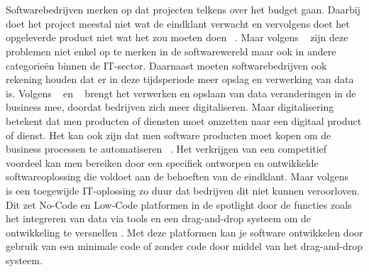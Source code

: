 
\chapter{}%
\label{ch:inleiding}



Softwarebedrijven merken op dat projecten telkens over het budget gaan. Daarbij doet het project meestal niet wat de eindklant verwacht en vervolgens doet het opgeleverde product niet wat het zou moeten doen ~\autocite{Moskal_2021}.
Maar volgens ~\textcite{Moskal_2021} zijn deze problemen niet enkel op te merken in de softwarewereld maar ook in andere categorieën binnen de IT-sector. 
Daarnaast moeten softwarebedrijven ook rekening houden dat er in deze tijdsperiode meer opslag en verwerking van data is.
Volgens ~\textcite{Moskal_2021} en ~\textcite{Parviainen_2022} brengt het verwerken en opslaan van data veranderingen in de business mee, 
doordat bedrijven zich meer digitaliseren. Maar digitalisering betekent dat men producten of diensten moet omzetten naar een digitaal product 
of dienst. Het kan ook zijn dat men software producten moet kopen om de business processen te automatiseren ~\autocite{Moskal_2021}. 
Het verkrijgen van een competitief voordeel kan men bereiken door een specifiek ontworpen en ontwikkelde softwareoplossing die voldoet aan de behoeften van de eindklant.
Maar volgens ~\textcite{Moskal_2021} is een toegewijde IT-oplossing zo duur dat bedrijven dit niet kunnen veroorloven. Dit zet No-Code en Low-Code platformen in de spotlight
door de functies zoals het integreren van data via tools en een drag-and-drop systeem om de ontwikkeling te versnellen \autocite{Kulkarni_2021}. Met deze platformen kan je software ontwikkelen door gebruik van een minimale code
of zonder code door middel van het drag-and-drop systeem.

